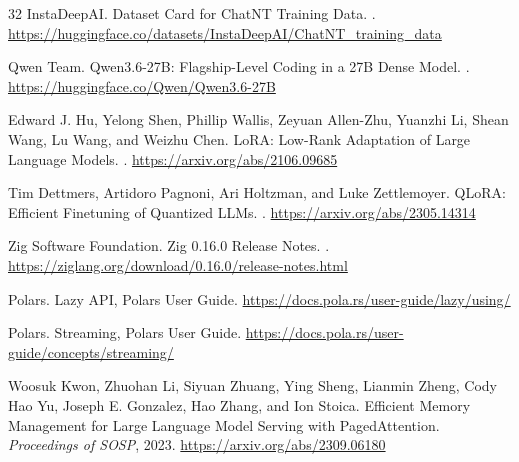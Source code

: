 \documentclass{article}
\begin{document}
\begin{thebibliography}{32}
    InstaDeepAI.
    \newblock Dataset Card for ChatNT Training Data.
    .
    \newblock \url{https://huggingface.co/datasets/InstaDeepAI/ChatNT_training_data}

    Qwen Team.
    \newblock Qwen3.6-27B: Flagship-Level Coding in a 27B Dense Model.
    .
    \newblock \url{https://huggingface.co/Qwen/Qwen3.6-27B}

    Edward J. Hu, Yelong Shen, Phillip Wallis, Zeyuan Allen-Zhu, Yuanzhi Li, Shean Wang, Lu Wang, and Weizhu Chen.
    \newblock LoRA: Low-Rank Adaptation of Large Language Models.
    .
    \newblock \url{https://arxiv.org/abs/2106.09685}

    Tim Dettmers, Artidoro Pagnoni, Ari Holtzman, and Luke Zettlemoyer.
    \newblock QLoRA: Efficient Finetuning of Quantized LLMs.
    .
    \newblock \url{https://arxiv.org/abs/2305.14314}

    Zig Software Foundation.
    \newblock Zig 0.16.0 Release Notes.
    .
    \newblock \url{https://ziglang.org/download/0.16.0/release-notes.html}

    Polars.
    \newblock Lazy API, Polars User Guide.
    \newblock \url{https://docs.pola.rs/user-guide/lazy/using/}

    Polars.
    \newblock Streaming, Polars User Guide.
    \newblock \url{https://docs.pola.rs/user-guide/concepts/streaming/}

    Woosuk Kwon, Zhuohan Li, Siyuan Zhuang, Ying Sheng, Lianmin Zheng, Cody Hao Yu, Joseph E. Gonzalez, Hao Zhang, and Ion Stoica.
    \newblock Efficient Memory Management for Large Language Model Serving with PagedAttention.
    \newblock \emph{Proceedings of SOSP}, 2023.
    \newblock \url{https://arxiv.org/abs/2309.06180}
\end{thebibliography}
\end{document}
